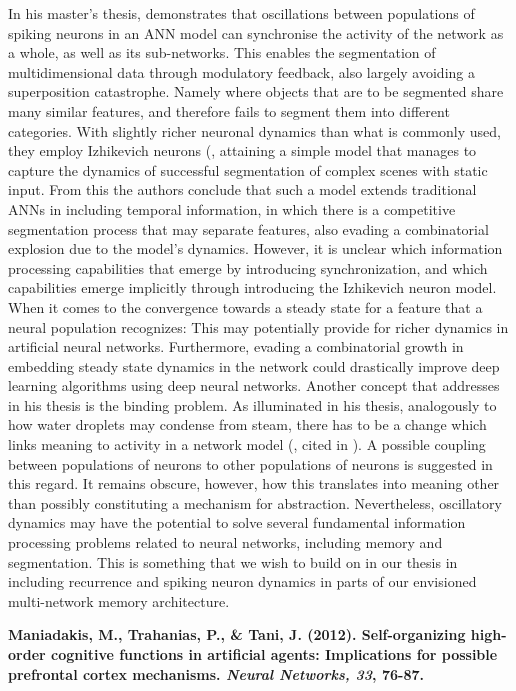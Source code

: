 In his master's thesis, \cite{Solbakken2009} demonstrates that oscillations between populations of spiking neurons in an ANN model can synchronise the activity of the network as a whole, as well as its sub-networks. This enables the segmentation of multidimensional data through modulatory feedback, also largely avoiding a superposition catastrophe. Namely where objects that are to be segmented share many similar features, and therefore fails to segment them into different categories. With slightly richer neuronal dynamics than what is commonly used, they employ Izhikevich neurons (\cite{Izhikevich2003}, attaining a simple model that manages to capture the dynamics of successful segmentation of complex scenes with static input. From this the authors conclude that such a model extends traditional ANNs in including temporal information, in which there is a competitive segmentation process that may separate features, also evading a combinatorial explosion due to the model's dynamics. However, it is unclear which information processing capabilities that emerge by introducing synchronization, and which capabilities emerge implicitly through introducing the Izhikevich neuron model. When it comes to the convergence towards a steady state for a feature that a neural population recognizes: This may potentially provide for richer dynamics in artificial neural networks. Furthermore, evading a combinatorial growth in embedding steady state dynamics in the network could drastically improve deep learning algorithms using deep neural networks. Another concept that \cite{Solbakken2009} addresses in his thesis is the binding problem. As illuminated in his thesis, analogously to how water droplets may condense from steam,  there has to be a change which links meaning to activity in a network model (\cite{Freeman2003}, cited in \cite{Solbakken2009}). A possible coupling between populations of neurons to other populations of neurons is suggested in this regard. It remains obscure, however, how this translates into meaning other than possibly constituting a mechanism for abstraction. Nevertheless, oscillatory dynamics may have the potential to solve several fundamental information processing problems related to neural networks, including memory and segmentation. This is something that we wish to build on in our thesis in including recurrence and spiking neuron dynamics in parts of our envisioned multi-network memory architecture.


\textbf{Maniadakis, M., Trahanias, P., \& Tani, J. (2012). Self-organizing high-order cognitive functions in artificial agents: Implications for possible prefrontal cortex mechanisms. \textit{Neural Networks, 33}, 76-87.}

